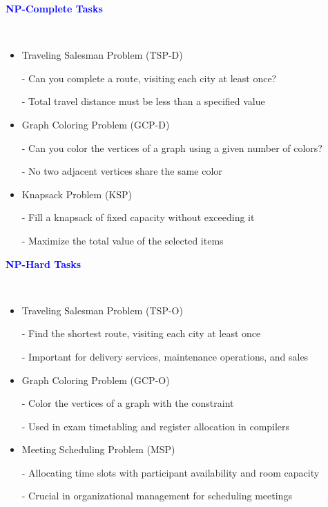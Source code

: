\documentclass[professionalfont]{beamer}
\begin{document}
\begin{frame}
\begin{center}
    { \textbf{\textcolor{blue}{ {\fontsize{12}{14}\selectfont NP-Complete Tasks} }} }
\end{center}
\\[0.5cm]

{\fontsize{10}{14}\selectfont 
\begin{itemize}
    \item Traveling Salesman Problem (TSP-D)

    - Can you complete a route, visiting each city at least once?

    - Total travel distance must be less than a specified value

    \item Graph Coloring Problem (GCP-D)

    - Can you color the vertices of a graph using a given number of colors?

    - No two adjacent vertices share the same color

    \item Knapsack Problem (KSP)
    
    - Fill a knapsack of fixed capacity without exceeding it

    - Maximize the total value of the selected items
\end{itemize}
}

\end{frame}

\begin{frame}
\begin{center}
    { \textbf{\textcolor{blue}{ {\fontsize{12}{14}\selectfont NP-Hard Tasks} }} }
\end{center}
\\[0.5cm]

{\fontsize{10}{14}\selectfont 
\begin{itemize}
    \item Traveling Salesman Problem (TSP-O)

    - Find the shortest route, visiting each city at least once

    - Important for delivery services, maintenance operations, and sales

    \item Graph Coloring Problem (GCP-O)

    - Color the vertices of a graph with the constraint

    - Used in exam timetabling and register allocation in compilers

    \item Meeting Scheduling Problem (MSP)
    
    - Allocating time slots with participant availability and room capacity

    - Crucial in organizational management for scheduling meetings
\end{itemize}
}

\end{frame}
\end{document}
